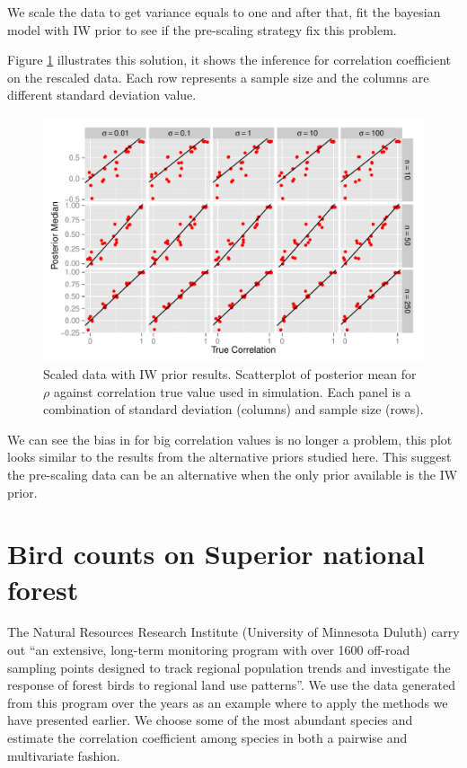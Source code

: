 \documentclass[a4paper]{article}
\begin{document}
We scale the data to get variance equals to one and after that, fit the bayesian model with IW prior to see if the pre-scaling strategy fix this problem. 

Figure \ref{sciw} illustrates this solution, it shows the inference for correlation coefficient on the rescaled data. Each row represents a sample size and the columns are different standard deviation value. 

\begin{figure}[htbp]
   \centering
   \includegraphics[width=\textwidth]{scIW} %
    \vspace{-.5in}
   \caption{Scaled data with IW prior results. Scatterplot of posterior mean for $\rho$  against correlation true value used in simulation. Each panel is a combination of standard deviation (columns) and sample size (rows). \label{sciw} }
\end{figure}

We can see the bias in for big correlation values is no longer a problem, this plot looks similar to the results from the alternative priors studied here. This suggest the pre-scaling data can be an alternative when the only prior available is the IW prior. 


\section{Bird counts on Superior national forest}

The Natural Resources Research Institute (University of Minnesota Duluth) carry out ``an extensive, long-term monitoring program with over 1600 off-road sampling points designed to track regional population trends and investigate the response of forest birds to regional land use patterns''. We use the data generated from this program over the years as an example where to apply the methods we have presented earlier. We choose some of the most abundant species and estimate the correlation coefficient among species in both a pairwise and multivariate fashion. 
\end{document}
